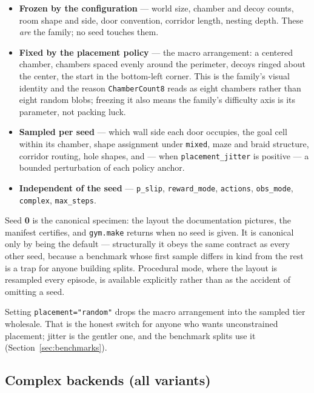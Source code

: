 \documentclass[11pt]{article}
\begin{document}
\begin{itemize}[leftmargin=2em, itemsep=1pt]
  \item \textbf{Frozen by the configuration} --- world size, chamber
        and decoy counts, room shape and side, door convention,
        corridor length, nesting depth. These \emph{are} the family;
        no seed touches them.
  \item \textbf{Fixed by the placement policy} --- the macro
        arrangement: a centered chamber, chambers spaced evenly around
        the perimeter, decoys ringed about the center, the start in
        the bottom-left corner. This is the family's visual identity
        and the reason \texttt{ChamberCount8} reads as eight chambers
        rather than eight random blobs; freezing it also means the
        family's difficulty axis is its parameter, not packing luck.
  \item \textbf{Sampled per seed} --- which wall side each door
        occupies, the goal cell within its chamber, shape assignment
        under \texttt{mixed}, maze and braid structure, corridor
        routing, hole shapes, and --- when \texttt{placement\_jitter}
        is positive --- a bounded perturbation of each policy anchor.
  \item \textbf{Independent of the seed} --- \texttt{p\_slip},
        \texttt{reward\_mode}, \texttt{actions},
        \texttt{obs\_mode}, \texttt{complex}, \texttt{max\_steps}.
\end{itemize}

Seed \textbf{0} is the canonical specimen: the layout the
documentation pictures, the manifest certifies, and
\texttt{gym.make} returns when no seed is given. It is canonical only
by being the default --- structurally it obeys the same contract as
every other seed, because a benchmark whose first sample differs in
kind from the rest is a trap for anyone building splits. Procedural
mode, where the layout is resampled every episode, is available
explicitly rather than as the accident of omitting a seed.

Setting \texttt{placement="random"} drops the macro arrangement into
the sampled tier wholesale. That is the honest switch for anyone who
wants unconstrained placement; jitter is the gentler one, and the
benchmark splits use it (Section~\ref{sec:benchmarks}).

\subsection{Complex backends (all variants)}
\label{sec:complex}
\end{document}
